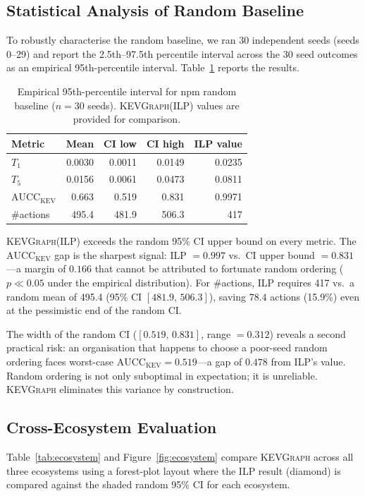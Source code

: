 \documentclass[conference]{IEEEtran}
\newcommand{\kevgraph}{\textsc{KEVGraph}\xspace}
\newcommand{\aucc}{$\mathrm{AUCC}_{\mathrm{KEV}}$\xspace}
\newcommand{\Tone}{$T_1$\xspace}
\newcommand{\Tfive}{$T_5$\xspace}
\begin{document}
\subsection{Statistical Analysis of Random Baseline}

To robustly characterise the random baseline, we ran 30 independent
seeds (seeds 0--29) and report the 2.5th--97.5th percentile interval
across the 30 seed outcomes as an empirical 95th-percentile interval.
Table~\ref{tab:random_ci} reports the results.

\begin{table}[t]
\centering
\caption{Empirical 95th-percentile interval for npm random baseline
($n=30$ seeds).
\kevgraph (ILP) values are provided for comparison.}
\label{tab:random_ci}
\begin{tabular}{lrrrr}
\toprule
Metric & Mean & CI low & CI high & ILP value \\
\midrule
\Tone   & 0.0030 & 0.0011 & 0.0149 & 0.0235 \\
\Tfive  & 0.0156 & 0.0061 & 0.0473 & 0.0811 \\
\aucc   & 0.663  & 0.519  & 0.831  & 0.9971 \\
\#actions & 495.4 & 481.9 & 506.3  & 417    \\
\bottomrule
\end{tabular}
\end{table}

\kevgraph (ILP) exceeds the random 95\% CI upper bound on every metric.
The \aucc gap is the sharpest signal: ILP $= 0.997$ vs.\ CI upper
bound $= 0.831$---a margin of $0.166$ that cannot be attributed to
fortunate random ordering ($p \ll 0.05$ under the empirical distribution).
For \#actions, ILP requires 417 vs.\ a random mean of 495.4
(95\% CI $[481.9,\, 506.3]$), saving $78.4$ actions (15.9\%) even at
the pessimistic end of the random CI.

The width of the random CI ($[0.519,\, 0.831]$, range $= 0.312$) reveals
a second practical risk: an organisation that happens to choose a
poor-seed random ordering faces worst-case \aucc $= 0.519$---a gap of
$0.478$ from ILP's value.  Random ordering is not only suboptimal in
expectation; it is unreliable.  \kevgraph eliminates this variance by
construction.

\subsection{Cross-Ecosystem Evaluation}

Table~\ref{tab:ecosystem} and Figure~\ref{fig:ecosystem} compare
\kevgraph across all three ecosystems using a forest-plot layout
where the ILP result (diamond) is compared against the shaded random
95\% CI for each ecosystem.
\end{document}
